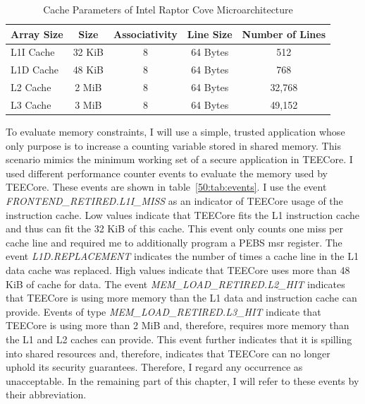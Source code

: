 \begin{table}[ht]
    \centering
    \begin{tabular}{ |l||c|c|c|c| }
        \hline
        Array Size & Size   & Associativity & Line Size & Number of Lines \\
        \hline
        L1I Cache  & 32 KiB & 8             & 64 Bytes  & 512             \\
        L1D Cache  & 48 KiB & 8             & 64 Bytes  & 768             \\
        L2 Cache   & 2 MiB  & 8             & 64 Bytes  & 32,768          \\
        L3 Cache   & 3 MiB  & 8             & 64 Bytes  & 49,152          \\
        \hline
    \end{tabular}
    \caption{Cache Parameters of Intel Raptor Cove Microarchitecture}
    \label{50:tab:cache_size}
\end{table}

To evaluate memory constraints, I will use a simple, trusted application whose
only purpose is to increase a counting variable stored in shared memory. This
scenario mimics the minimum working set of a secure application in TEECore. I
used different performance counter events to evaluate the memory used by
TEECore. These events are shown in table~\ref{50:tab:events}. I use the event
\textit{FRONTEND\_RETIRED.L1I\_MISS} as an indicator of TEECore usage of the
instruction cache. Low values indicate that TEECore fits the L1 instruction
cache and thus can fit the 32 KiB of this cache. This event only counts one miss
per cache line and required me to additionally program a PEBS \gls{msr}
register. The event \textit{L1D.REPLACEMENT} indicates the number of times a
cache line in the L1 data cache was replaced. High values indicate that TEECore
uses more than 48 KiB of cache for data. The event
\textit{MEM\_LOAD\_RETIRED.L2\_HIT} indicates that TEECore is using more memory
than the L1 data and instruction cache can provide. Events of type
\textit{MEM\_LOAD\_RETIRED.L3\_HIT} indicate that TEECore is using more than 2
MiB and, therefore, requires more memory than the L1 and L2 caches can provide.
This event further indicates that it is spilling into shared resources and,
therefore, indicates that TEECore can no longer uphold its security guarantees.
Therefore, I regard any occurrence as unacceptable. In the remaining part of
this chapter, I will refer to these events by their abbreviation.

